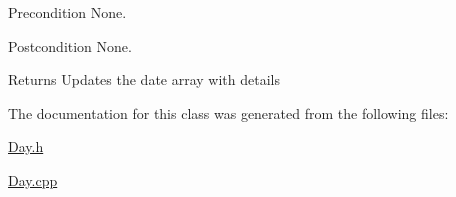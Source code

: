 \begin{DoxyPrecond}{Precondition}
None. 
\end{DoxyPrecond}
\begin{DoxyPostcond}{Postcondition}
None. 
\end{DoxyPostcond}
\begin{DoxyReturn}{Returns}
Updates the date array with details 
\end{DoxyReturn}


The documentation for this class was generated from the following files\-:\begin{DoxyCompactItemize}
\item 
\hyperlink{Day_8h}{Day.\-h}\item 
\hyperlink{Day_8cpp}{Day.\-cpp}\end{DoxyCompactItemize}
